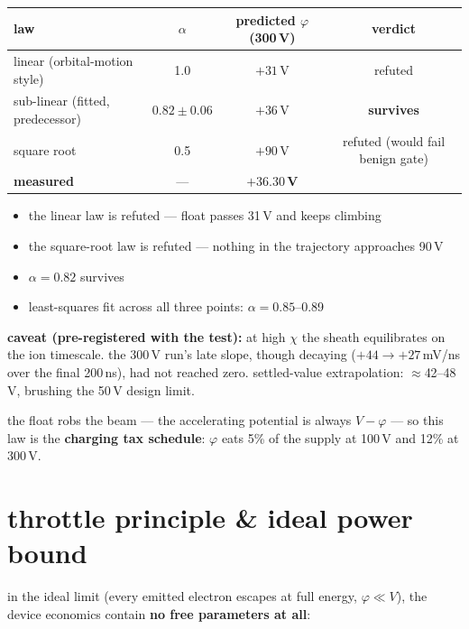 \documentclass[11pt]{article}
\begin{document}
\begin{center}\small
\begin{tabular}{lccc}
\toprule
law & $\alpha$ & predicted $\varphi$(300\,V) & verdict \\
\midrule
linear (orbital-motion style) & 1.0  & $+31$\,V &
  \textcolor{gfail}{refuted} \\
sub-linear (fitted, predecessor) & $0.82 \pm 0.06$ & $+36$\,V &
  \textcolor{gpass}{\textbf{survives}} \\
square root & 0.5  & $+90$\,V &
  \textcolor{gfail}{refuted (would fail benign gate)} \\
\midrule
\textbf{measured} & --- & $\boldsymbol{+36.30}$\,\textbf{V} & \\
\bottomrule
\end{tabular}
\end{center}

\begin{itemize}
  \item the linear law is refuted --- float passes 31\,V and keeps climbing
  \item the square-root law is refuted --- nothing in the trajectory approaches
        90\,V
  \item $\alpha = 0.82$ survives
  \item least-squares fit across all three points: $\alpha = 0.85$--0.89
\end{itemize}

\textbf{caveat (pre-registered with the test):} at high $\chi$ the sheath
equilibrates on the ion timescale.  the 300\,V run's late slope, though
decaying ($+44 \to +27$\,mV/ns over the final 200\,ns), had not reached zero.
settled-value extrapolation: $\approx$42--48\,V, brushing the 50\,V design
limit.

the float robs the beam --- the accelerating potential is always $V - \varphi$
--- so this law is the \textbf{charging tax schedule}: $\varphi$ eats 5\% of
the supply at 100\,V and 12\% at 300\,V.

\section{throttle principle \& ideal power bound}

in the ideal limit (every emitted electron escapes at full energy,
$\varphi \ll V$), the device economics contain \textbf{no free parameters at
all}:
\end{document}
